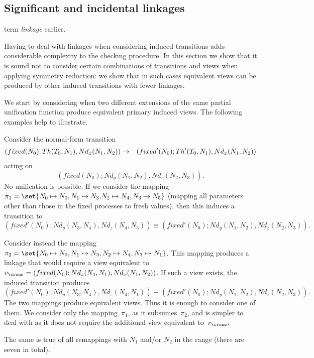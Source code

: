\subsection{Significant and incidental linkages}

 term \emph{linkage} earlier.

Having to deal with linkages when considering induced transitions adds
considerable complexity to the checking procedure.  In this section we show
that it is sound not to consider certain combinations of transitions and views
when applying symmetry reduction: we show that in such cases equivalent views
can be produced by other induced transitions with fewer linkages.  

We start by considering when two different extensions of the same partial
unification function produce equivalent primary induced views.  The following
examples help to illustrate. 

\begin{example}\label{example:29}
Consider the normal-form transition
\begin{eqnarray*}
(fixed(N_0); Th(T_0,N_1), Nd_x(N_1,N_2)) & \stackrel{}\rightarrow &
  (fixed'(N_0); Th'(T_0,N_1), Nd_x(N_1,N_2))
\end{eqnarray*}
acting on 
\[
(fixed(N_0); Nd_y(N_1,N_2), Nd_z(N_2,N_3)).
\]
No unification is possible.  If we consider the mapping $\pi_1 = \set{N_0
  \mapsto N_0, \linebreak[1] {N_1 \mapsto N_3,} \linebreak[1] N_2 \mapsto N_4,
  N_3 \mapsto N_5}$ (mapping all parameters other than those in the fixed
processes to fresh values), then this induces a transition to
\[
(fixed'(N_0); Nd_y(N_3,N_4), Nd_z(N_4,N_5)) \equiv 
  (fixed'(N_0); Nd_y(N_1,N_2), Nd_z(N_2,N_3)).
\] 

Consider instead the mapping $\pi_2 = \set{N_0 \mapsto N_0, N_1 \mapsto N_3,
  N_2 \mapsto N_4,\linebreak[1] {N_3 \mapsto N_1}}$.  This mapping produces a
linkage that would require a view equivalent to $v_\cross = (fixed(N_0);
Nd_z(N_4,N_1), Nd_x(N_1,N_2))$.  If such a view exists, the induced transition
produces
\[
(fixed'(N_0); Nd_y(N_3,N_4), Nd_z(N_4,N_1)) \equiv 
  (fixed'(N_0); Nd_y(N_1,N_2), Nd_z(N_2,N_3)).
\]
The two mappings produce equivalent views.  Thus it is enough to consider one
of them.  We consider only the mapping~$\pi_1$, as it subsumes~$\pi_2$, and is
simpler to deal with as it does not require the additional view equivalent
to~$v_\cross$.

The same is true of all remappings with $N_1$ and/or $N_2$ in the range (there
are seven in total).
\end{example}

